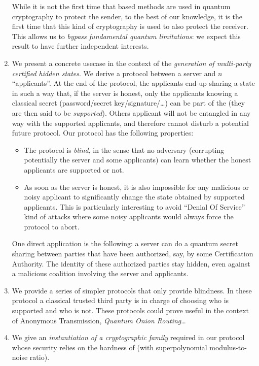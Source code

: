\begin{enumerate}[listparindent=\parindent]
        While it is not the first time that \LWE{} based methods are used in quantum cryptography to protect the sender, to the best of our knowledge, it is the first time that this kind of cryptography is used to also protect the receiver. This allows us to \emph{bypass fundamental quantum limitations}: we expect this result to have further independent interests.
  \item We present a concrete usecase in the context of the \emph{generation of multi-party certified hidden \GHZ{} states}. We derive a protocol between a server and $n$ ``applicants''. At the end of the protocol, the applicants end-up sharing a \GHZ{} state in such a way that, if the server is honest, only the applicants knowing a classical secret (password/secret key/signature/\dots{}) can be part of the \GHZ{} (they are then said to be \emph{supported}). Others applicant will not be entangled in any way with the supported applicants, and therefore cannot disturb a potential future protocol. Our protocol has the following properties:
        \begin{itemize}
          \item The protocol is \emph{blind}, in the sense that no adversary (corrupting potentially the server and some applicants) can learn whether the honest applicants are supported or not.
          \item As soon as the server is honest, it is also impossible for any malicious or noisy applicant to significantly change the \GHZ{} state obtained by supported applicants. This is particularly interesting to avoid ``Denial Of Service'' kind of attacks where some noisy applicants would always force the protocol to abort.
        \end{itemize}

        One direct application is the following: a server can do a quantum secret sharing between parties that have been authorized, say, by some Certification Authority. The identity of these authorized parties stay hidden, even against a malicious coalition involving the server and applicants.
  \item We provide a series of simpler protocols that only provide blindness. In these protocol a classical trusted third party is in charge of choosing who is supported and who is not. These protocols could prove useful in the context of Anonymous Transmission, \emph{Quantum Onion Routing}\dots{}
  \item We give an \emph{instantiation of a cryptographic family} required in our protocol whose security relies on the hardness of \LWE{} (with superpolynomial modulus-to-noise ratio).
\end{enumerate}
